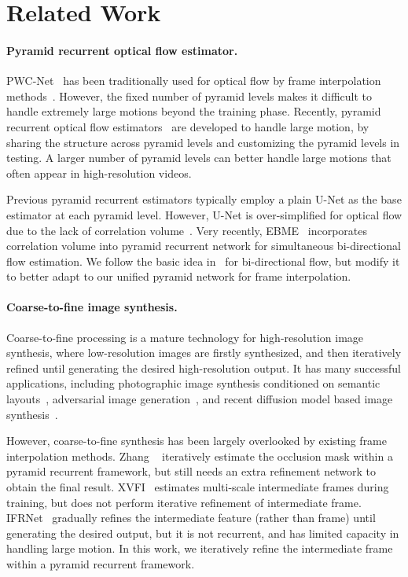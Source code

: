 \documentclass[10pt,twocolumn,letterpaper]{article}
\begin{document}
\section{Related Work}
\label{sec:related}


\paragraph{Pyramid recurrent optical flow estimator.} PWC-Net~\cite{sun2018pwc}
has been traditionally used for optical flow by frame interpolation
methods~\cite{niklaus2018context,bao2019depth,niklaus2020softmax}.  However, the
fixed number of pyramid levels makes it difficult to handle extremely large
motions beyond the training phase. Recently, pyramid recurrent optical flow
estimators~\cite{zhang2020flexible,sim2021xvfi} are developed to handle large
motion, by sharing the structure across pyramid levels and customizing the
pyramid levels in testing. A larger number of pyramid levels can better handle
large motions that often appear in high-resolution videos.


Previous pyramid recurrent estimators typically employ a plain U-Net as the base
estimator at each pyramid level. However, U-Net is over-simplified for optical
flow due to the lack of correlation volume~\cite{sun2018pwc,teed2020raft}.  Very
recently, EBME~\cite{jin2022enhanced} incorporates correlation volume into
pyramid recurrent network for simultaneous bi-directional flow estimation.  We
follow the basic idea in~\cite{jin2022enhanced} for bi-directional flow, but
modify it to better adapt to our unified pyramid network for frame
interpolation.


\paragraph{Coarse-to-fine image synthesis.}  Coarse-to-fine processing is a
mature technology for high-resolution image synthesis, where low-resolution
images are firstly synthesized, and then iteratively refined until generating
the desired high-resolution output. It has many successful applications,
including photographic image synthesis conditioned on semantic
layouts~\cite{chen2017photographic}, adversarial image
generation~\cite{denton2015deep}, and recent diffusion model based image
synthesis~\cite{esser2021imagebart}.



However, coarse-to-fine synthesis has been largely overlooked by existing frame
interpolation methods. Zhang \etal~\cite{zhang2020flexible} iteratively estimate
the occlusion mask within a pyramid recurrent framework, but still needs an
extra refinement network to obtain the final result. XVFI~\cite{sim2021xvfi}
estimates multi-scale intermediate frames during training, but does not perform
iterative refinement of intermediate frame.  IFRNet~\cite{kong2022ifrnet}
gradually refines the intermediate feature (rather than frame) until generating
the desired output, but it is not recurrent, and has limited capacity in
handling large motion. In this work, we iteratively refine the intermediate
frame within a pyramid recurrent framework.
\end{document}
